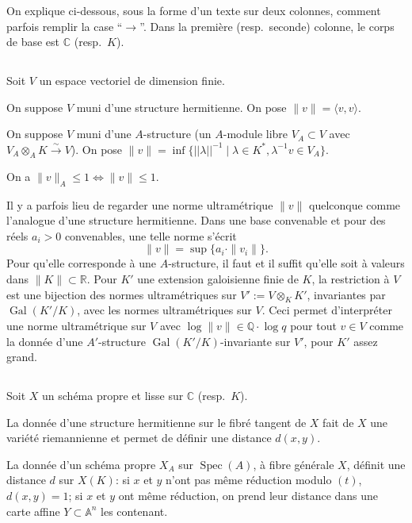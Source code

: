 \documentclass[12pt,a4paper]{article}
\theoremstyle{plain}
\theoremstyle{definition}
\DeclareMathOperator{\Spec}{Spec}
\DeclareMathOperator{\Gal}{Gal}
\newcommand{\QQ}{\mathbb{Q}}
\newcommand{\RR}{\mathbb{R}}
\newcommand{\CC}{\mathbb{C}}
\begin{document}
On explique ci-dessous, sous la forme d'un texte sur deux colonnes, comment
parfois remplir la case ``$\to$''. Dans la premi\`ere (resp.\ seconde) colonne, le corps
de base est $\CC$ (resp.\ $K$).

\subsection{}

Soit $V$ un espace vectoriel de dimension finie.

\smallskip

\begin{minipage}[t]{0.48\textwidth}
On suppose $V$ muni d'une
structure hermitienne. On pose
$\|v\| = \langle v,v \rangle$.
\end{minipage}
\hfill
\begin{minipage}[t]{0.48\textwidth}
On suppose $V$ muni d'une
$A$-structure (un $A$-module libre
$V_A \subset V$ avec $V_A \otimes_A K \xrightarrow{\sim} V$). On
pose $\|v\| = \inf\{||\lambda||^{-1} \mid \lambda \in K^*, \lambda^{-1}v \in V_A\}$.
\end{minipage}

\smallskip

On a $\|v\|_A \leq 1 \iff \|v\| \leq 1$.

Il y a parfois lieu de regarder une norme ultram\'etrique $\|v\|$ quelconque
comme l'analogue d'une structure hermitienne. Dans une base convenable et pour
des r\'eels $a_i > 0$ convenables, une telle norme s'\'ecrit
\[
\|v\| = \sup\{a_i \cdot \|v_i\|\} .
\]
Pour qu'elle corresponde \`a une $A$-structure, il faut et il suffit qu'elle soit \`a
valeurs dans $\|K\| \subset \RR$. Pour $K'$ une extension galoisienne finie de $K$, la
restriction \`a $V$ est une bijection des normes ultram\'etriques sur $V' := V \otimes_K K'$,
invariantes par $\Gal(K'/K)$, avec les normes ultram\'etriques sur $V$. Ceci permet
d'interpr\'eter une norme ultram\'etrique sur $V$ avec $\log \|v\| \in \QQ \cdot \log q$ pour
tout $v \in V$ comme la donn\'ee d'une $A'$-structure $\Gal(K'/K)$-invariante sur $V'$,
pour $K'$ assez grand.

\subsection{}

Soit $X$ un sch\'ema propre et lisse sur $\CC$ (resp.\ $K$).

\smallskip

\begin{minipage}[t]{0.48\textwidth}
La donn\'ee d'une structure
hermitienne sur le fibr\'e tangent
de $X$ fait de $X$ une vari\'et\'e
riemannienne et permet de
d\'efinir une distance $d(x,y)$.
\end{minipage}
\hfill
\begin{minipage}[t]{0.48\textwidth}
La donn\'ee d'un sch\'ema propre $X_A$ sur
$\Spec(A)$, \`a fibre g\'en\'erale $X$, d\'efinit
une distance $d$ sur $X(K)$: si $x$ et
$y$ n'ont pas m\^eme r\'eduction modulo $(t)$,
$d(x,y) = 1$; si $x$ et $y$ ont m\^eme
r\'eduction, on prend leur distance dans
une carte affine $Y \subset \mathbb{A}^n$ les contenant.
\end{minipage}
\end{document}
